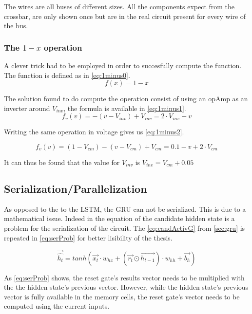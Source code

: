 The wires are all buses of different sizes. All the components expect from the crossbar, are only shown once but are in the real circuit present for every wire of the bus.

\subsubsection{The $1-x$ operation}

A clever trick had to be employed in order to succesfully compute the function. The function is defined as in \cref{eq:1minus0}.
\begin{equation}\label{eq:1minus0}
  f(x)=1-x
\end{equation}

The solution found to do compute the operation consist of using an \ac{opAmp} as an inverter around $V_{inv}$, the formula is available in \cref{eq:1minus1}.
\begin{equation}\label{eq:1minus1}
  f_v(v)=-(v-V_{inv})+V_{inv}=2\cdot V_{inv} -v
\end{equation}

Writing the same operation in voltage gives us \cref{eq:1minus2}.

\begin{equation}\label{eq:1minus2}
  f_v(v)=(1-V_{cm})-(v-V_{cm})+V_{cm}= 0.1-v+2\cdot V_{cm}
\end{equation}

It can thus be found that the value for $V_{inv}$ is $V_{inv}=V_{cm}+0.05$

\subsection{Serialization/Parallelization}
\label{subsec:gruSerPar}

As opposed to the to the \ac{LSTM}, the \ac{GRU} can not be serialized. This is due to a mathematical issue. Indeed in the equation of the candidate hidden state is a problem for the serialization of the circuit. The \cref{eq:candActivG} from \cref{sec:gru} is repeated in \cref{eq:serProb} for better lisibility of the thesis.

\begin{equation}\label{eq:serProb}
  \overrightarrow{\hat{h_t}}=tanh(\overrightarrow{x_t}\cdot w_{hx}+(\overrightarrow{r_t}\odot\overrightarrow{h_{t-1}}) \cdot w_{hh} + \overrightarrow{b_h})
\end{equation}

As \cref{eq:serProb} shows, the reset gate's results vector needs to be multiplied with the the hidden state's previous vector. However, while the hidden state's previous vector is fully available in the memory cells, the reset gate's vector needs to be computed using the current inputs.

